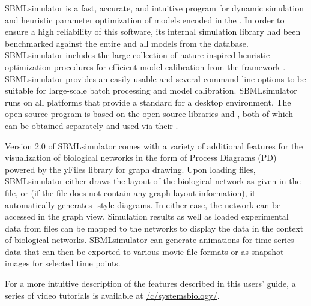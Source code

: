 SBMLsimulator is a fast, accurate, and intuitive program for dynamic simulation and heuristic parameter optimization of models encoded in the \SBML.
In order to ensure a high reliability of this software, its internal simulation library had been
benchmarked against the entire \SBMLTestSuite and all models from the \BioModels database.
SBMLsimulator includes the large collection of nature-inspired heuristic optimization procedures for efficient model calibration from the framework \EvA.
SBMLsimulator provides an easily usable \GUI and several command-line options to be suitable for large-scale batch processing and model calibration.
SBMLsimulator runs on all platforms that provide a standard \JVM for a desktop environment.
The open-source program is based on the open-source libraries \JSBML and \SBSCL, both of which can be obtained separately and used via their \API.

Version 2.0 of SBMLsimulator comes with a variety of additional features for the visualization of biological networks in the form of \SBGN Process Diagrams (PD) powered by the yFiles library for graph drawing.
Upon loading \SBML files, SBMLsimulator either draws the layout of the biological network as given in the file, or (if the \SBML file does not contain any graph layout information), it automatically generates \SBGN-style diagrams.
In either case, the network can be accessed in the graph view.
Simulation results as well as loaded experimental data from \CSV files can be mapped to the networks to display the data in the context of biological networks.
SBMLsimulator can generate animations for time-series data that can then be exported to various movie file formats or as snapshot images for selected time points.

For a more intuitive description of the features described in this users' guide, a series of video tutorials is available at \href{https://youtube.com/c/systemsbiology/}{\faYoutube/c/systemsbiology/}.
